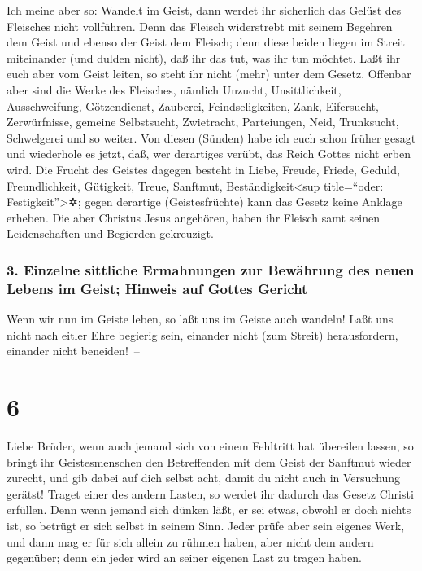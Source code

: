  Ich meine aber so: Wandelt im Geist, dann werdet ihr
sicherlich das Gelüst des Fleisches nicht vollführen. 
Denn das Fleisch widerstrebt mit seinem Begehren dem Geist und ebenso
der Geist dem Fleisch; denn diese beiden liegen im Streit miteinander
(und dulden nicht), daß ihr das tut, was ihr tun möchtet.
 Laßt ihr euch aber vom Geist leiten, so steht ihr nicht
(mehr) unter dem Gesetz.  Offenbar aber sind die Werke
des Fleisches, nämlich Unzucht, Unsittlichkeit, Ausschweifung,
 Götzendienst, Zauberei, Feindseligkeiten, Zank,
Eifersucht, Zerwürfnisse, gemeine Selbstsucht, Zwietracht, Parteiungen,
 Neid, Trunksucht, Schwelgerei und so weiter. Von diesen
(Sünden) habe ich euch schon früher gesagt und wiederhole es jetzt, daß,
wer derartiges verübt, das Reich Gottes nicht erben wird.
 Die Frucht des Geistes dagegen besteht in Liebe, Freude,
Friede, Geduld, Freundlichkeit, Gütigkeit, Treue, 
Sanftmut, Beständigkeit\textless sup title=``oder:
Festigkeit''\textgreater✲; gegen derartige (Geistesfrüchte) kann das
Gesetz keine Anklage erheben.  Die aber Christus Jesus
angehören, haben ihr Fleisch samt seinen Leidenschaften und Begierden
gekreuzigt.

\hypertarget{einzelne-sittliche-ermahnungen-zur-bewuxe4hrung-des-neuen-lebens-im-geist-hinweis-auf-gottes-gericht}{%
\subsubsection{3. Einzelne sittliche Ermahnungen zur Bewährung des neuen
Lebens im Geist; Hinweis auf Gottes
Gericht}\label{einzelne-sittliche-ermahnungen-zur-bewuxe4hrung-des-neuen-lebens-im-geist-hinweis-auf-gottes-gericht}}

 Wenn wir nun im Geiste leben, so laßt uns im Geiste auch
wandeln!  Laßt uns nicht nach eitler Ehre begierig sein,
einander nicht (zum Streit) herausfordern, einander nicht beneiden!~--

\hypertarget{section-5}{%
\section{6}\label{section-5}}

 Liebe Brüder, wenn auch jemand sich von einem Fehltritt
hat übereilen lassen, so bringt ihr Geistesmenschen den Betreffenden mit
dem Geist der Sanftmut wieder zurecht, und gib dabei auf dich selbst
acht, damit du nicht auch in Versuchung gerätst!  Traget
einer des andern Lasten, so werdet ihr dadurch das Gesetz Christi
erfüllen.  Denn wenn jemand sich dünken läßt, er sei
etwas, obwohl er doch nichts ist, so betrügt er sich selbst in seinem
Sinn.  Jeder prüfe aber sein eigenes Werk, und dann mag er
für sich allein zu rühmen haben, aber nicht dem andern gegenüber;
 denn ein jeder wird an seiner eigenen Last zu tragen
haben.

